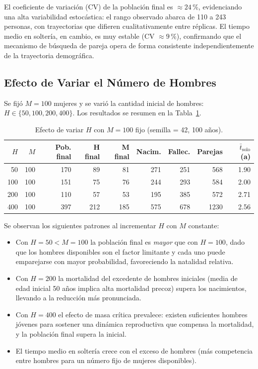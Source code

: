 \documentclass[12pt, a4paper]{article}
\begin{document}
\noindent
El coeficiente de variación (CV) de la población final es $\approx 24\,\%$, evidenciando
una alta variabilidad estocástica: el rango observado abarca de 110 a 243 personas,
con trayectorias que difieren cualitativamente entre réplicas.
El tiempo medio en soltería, en cambio, es muy estable (CV $\approx 9\,\%$),
confirmando que el mecanismo de búsqueda de pareja opera de forma
consistente independientemente de la trayectoria demográfica.

\subsection{Efecto de Variar el Número de Hombres}

Se fijó $M = 100$ mujeres y se varió la cantidad inicial de hombres:
$H \in \{50, 100, 200, 400\}$. Los resultados se resumen en la
Tabla~\ref{tab:varia_h}.

\begin{table}[H]
  \centering
  \caption{Efecto de variar $H$ con $M = 100$ fijo (semilla = 42, 100 años).}
  \label{tab:varia_h}
  \small
  \begin{tabular}{@{}rrrrrrrrr@{}}
    \toprule
    $H$ & $M$ & \textbf{Pob. final} & \textbf{H final} & \textbf{M final}
        & \textbf{Nacim.} & \textbf{Fallec.} & \textbf{Parejas}
        & \textbf{$\bar{t}_\text{solo}$ (a)} \\
    \midrule
     50 & 100 & 170 &  89 &  81 & 271 & 251 &  568 & 1.90 \\
    100 & 100 & 151 &  75 &  76 & 244 & 293 &  584 & 2.00 \\
    200 & 100 & 110 &  57 &  53 & 195 & 385 &  572 & 2.71 \\
    400 & 100 & 397 & 212 & 185 & 575 & 678 & 1230 & 2.56 \\
    \bottomrule
  \end{tabular}
\end{table}

\noindent
Se observan los siguientes patrones al incrementar $H$ con $M$ constante:

\begin{itemize}
  \item Con $H = 50 < M = 100$ la población final es \textit{mayor} que con
        $H = 100$, dado que los hombres disponibles son el factor limitante y
        cada uno puede emparejarse con mayor probabilidad, favoreciendo la
        natalidad relativa.
  \item Con $H = 200$ la mortalidad del excedente de hombres iniciales (media
        de edad inicial 50 años implica alta mortalidad precoz) supera los
        nacimientos, llevando a la reducción más pronunciada.
  \item Con $H = 400$ el efecto de masa crítica prevalece: existen suficientes
        hombres jóvenes para sostener una dinámica reproductiva que compensa
        la mortalidad, y la población final supera la inicial.
  \item El tiempo medio en soltería crece con el exceso de hombres
        (más competencia entre hombres para un número fijo de mujeres
        disponibles).
\end{itemize}
\end{document}
